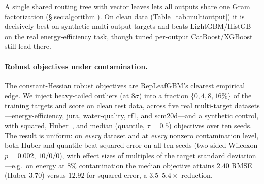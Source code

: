 \documentclass[11pt]{article}
\begin{document}
A single shared routing tree with vector leaves lets all outputs share one Gram
factorization (\S\ref{sec:algorithm}). On clean data (Table~\ref{tab:multioutput}) it is
decisively best on synthetic multi-output targets and beats LightGBM/HistGB on the real
energy-efficiency task, though tuned per-output CatBoost/XGBoost still lead there.

\paragraph{Robust objectives under contamination.} The constant-Hessian robust objectives
are RepLeafGBM's clearest empirical edge. We inject heavy-tailed outliers (at $8\sigma$)
into a fraction $\{0,4,8,16\%\}$ of the training targets and score on clean test data,
across five real multi-target datasets---energy-efficiency, jura, water-quality, rf1, and
scm20d---and a synthetic control, with squared, Huber~\citep{huber1964robust}, and median
(quantile, $\tau{=}0.5$) objectives over ten seeds. The result is uniform: on \emph{every}
dataset and at \emph{every} nonzero contamination level, both Huber and quantile beat
squared error on all ten seeds (two-sided Wilcoxon $p=0.002$, $10/0/0$), with effect sizes
of multiples of the target standard deviation---e.g.\ on energy at $8\%$ contamination the
median objective attains $2.40$ RMSE (Huber $3.70$) versus $12.92$ for squared error, a
$3.5$--$5.4\times$ reduction.
\end{document}
